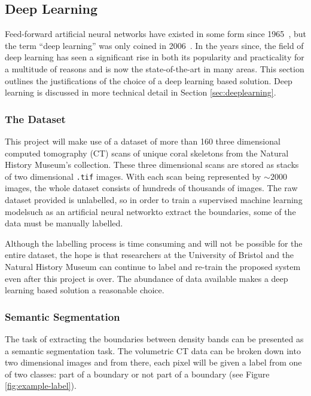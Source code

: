 \subsection{Deep Learning}
\label{sec:contextdl}

Feed-forward artificial neural networks have existed in some form since 1965~\cite{deepoverview, 1966cybernetic}, but the term ``deep learning'' was only coined in 2006~\cite{deepoverview, hintondeep, hintonfast}. In the years since, the field of deep learning has seen a significant rise in both its popularity and practicality for a multitude of reasons and is now the state-of-the-art in many areas. This section outlines the justifications of the choice of a deep learning based solution. Deep learning is discussed in more technical detail in Section \ref{sec:deeplearning}.

\subsubsection{The Dataset}

This project will make use of a dataset of more than 160 three dimensional computed tomography (CT) scans of unique coral skeletons from the Natural History Museum's collection. These three dimensional scans are stored as stacks of two dimensional \texttt{.tif} images. With each scan being represented by ${\sim}2000$ images, the whole dataset consists of hundreds of thousands of images. The raw dataset provided is unlabelled, so in order to train a supervised machine learning model\textemdash such as an artificial neural network\textemdash to extract the boundaries, some of the data must be manually labelled.

Although the labelling process is time consuming and will not be possible for the entire dataset, the hope is that researchers at the University of Bristol and the Natural History Museum can continue to label and re-train the proposed system even after this project is over. The abundance of data available makes a deep learning based solution a reasonable choice.

\subsubsection{Semantic Segmentation}
\label{sec:semseg}

The task of extracting the boundaries between density bands can be presented as a semantic segmentation task. The volumetric CT data can be broken down into two dimensional images and from there, each pixel will be given a label from one of two classes: part of a boundary or not part of a boundary (see Figure \ref{fig:example-label}).

